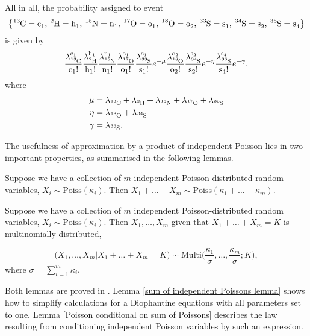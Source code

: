 All in all, the probability assigned to event
\begin{equation*}
 	\left\{ \cem{^{13}C} = \cem{c_1},\, \cem{^{2}H} = \cem{h_1},\, \cem{^{15}N} = \cem{n_1},\, \cem{^{17}O} = \cem{o_1},\, \cem{^{18}O} = \cem{o_2},\, \cem{^{33}S} = \cem{s_1},\, \cem{^{34}S} = \cem{s_2},\, \cem{^{36}S}= \cem{s_4} \right\}	
\end{equation*} 
is given by
\begin{equation}\label{QK Nominator}
	\poiss{\text{c}}{13}{1}
	\poiss{\text{h}}{2}{1}
	\poiss{\text{n}}{15}{1}
	\poiss{\text{o}}{17}{1}
	\poiss{\text{s}}{33}{1}
		e^{ - \mu}
	\poiss{\text{o}}{18}{2}	
	\poiss{\text{s}}{34}{2}
		e^{ - \eta }		
	\poiss{\text{s}}{36}{4}
		e^{ - \gamma },
\end{equation}
where 
\begin{align*}\label{intensities summed equation}
	\mu 	&=	\lambda_\cem{^{13}C} + \lambda_\cem{^{2}H} + \lambda_\cem{^{15}N} + \lambda_\cem{^{17}O} +\lambda_\cem{^{33}S}  	\\
	\eta 	&= 	\lambda_\cem{^{18}O} + \lambda_\cem{^{34}S}\\ 
	\gamma	&= 	\lambda_\cem{^{36}S}.
\end{align*}

The usefulness of approximation by a product of independent Poisson lies in two important properties, as summarised in the following lemmas.

\begin{lemma}\label{sum of independent Poissons lemma}
	Suppose we have a collection of $m$ independent Poisson-distributed random variables, $X_i \sim \mathrm{Poiss}(\kappa_i)$. Then $X_1 + \dots + X_m \sim \mathrm{Poiss}(\kappa_1 + \dots + \kappa_m)$. 
\end{lemma}  

\begin{lemma}\label{Poisson conditional on sum of Poissons}
	Suppose we have a collection of $m$ independent Poisson-distributed random variables, $X_i \sim \mathrm{Poiss}(\kappa_i)$. Then $X_1, \dots, X_m$ given that $X_1 + \dots + X_m = K$ is multinomially distributed,

$$ 
	\Big(X_1, \dots, X_m | X_1 + \dots + X_m = K \Big) 
	\sim 
	\mathrm{Multi}\Big( \frac{\kappa_1}{\sigma}, \dots, \frac{\kappa_m}{\sigma}; K \Big), 
$$
	where $\sigma = \sum_{i = 1}^m \kappa_i$.	
\end{lemma}
Both lemmas are proved in \cite{Kingman1993PoissonProcesses}. Lemma \ref{sum of independent Poissons lemma} shows how to simplify calculations for a Diophantine equations with all parameters set to one. Lemma \ref{Poisson conditional on sum of Poissons} describes the law resulting from conditioning independent Poisson variables by such an expression. 

